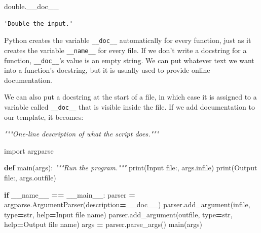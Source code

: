\documentclass[
]{krantz}
\makeatletter
\newenvironment{Shaded}{\begin{snugshade}}{\end{snugshade}}
\newcommand{\BuiltInTok}[1]{#1}
\newcommand{\CommentTok}[1]{\textcolor[rgb]{0.56,0.35,0.01}{\textit{#1}}}
\newcommand{\ControlFlowTok}[1]{\textcolor[rgb]{0.13,0.29,0.53}{\textbf{#1}}}
\newcommand{\ImportTok}[1]{#1}
\newcommand{\KeywordTok}[1]{\textcolor[rgb]{0.13,0.29,0.53}{\textbf{#1}}}
\newcommand{\NormalTok}[1]{#1}
\newcommand{\OperatorTok}[1]{\textcolor[rgb]{0.81,0.36,0.00}{\textbf{#1}}}
\newcommand{\StringTok}[1]{\textcolor[rgb]{0.31,0.60,0.02}{#1}}
\newcommand{\VariableTok}[1]{\textcolor[rgb]{0.00,0.00,0.00}{#1}}
\newenvironment{kframe}{%
\medskip{}
\setlength{\fboxsep}{.8em}
 \def\at@end@of@kframe{}%
 \ifinner\ifhmode%
  \def\at@end@of@kframe{\end{minipage}}%
  \begin{minipage}{\columnwidth}%
 \fi\fi%
 \def\FrameCommand##1{\hskip\@totalleftmargin \hskip-\fboxsep
 \colorbox{shadecolor}{##1}\hskip-\fboxsep
     \hskip-\linewidth \hskip-\@totalleftmargin \hskip\columnwidth}%
 \MakeFramed {\advance\hsize-\width
   \@totalleftmargin\z@ \linewidth\hsize
   \@setminipage}}%
 {\par\unskip\endMakeFramed%
 \at@end@of@kframe}
\renewenvironment{Shaded}{\begin{kframe}}{\end{kframe}}
\makeatother
\begin{document}
\begin{Shaded}
\begin{Highlighting}[]
\NormalTok{double.\_\_doc\_\_}
\end{Highlighting}
\end{Shaded}

\begin{verbatim}
'Double the input.'
\end{verbatim}

Python creates the variable \texttt{\_\_doc\_\_} automatically for every function,
just as it creates the variable \texttt{\_\_name\_\_} for every file.
If we don't write a docstring for a function,
\texttt{\_\_doc\_\_}'s value is an empty string.
We can put whatever text we want into a function's docstring,
but it is usually used to provide online documentation.

We can also put a docstring at the start of a file,
in which case it is assigned to a variable called \texttt{\_\_doc\_\_}
that is visible inside the file.
If we add documentation to our template,
it becomes:

\begin{Shaded}
\begin{Highlighting}[]
\CommentTok{"""One{-}line description of what the script does."""}

\ImportTok{import}\NormalTok{ argparse}


\KeywordTok{def}\NormalTok{ main(args):}
    \CommentTok{"""Run the program."""}
    \BuiltInTok{print}\NormalTok{(}\StringTok{\textquotesingle{}Input file:\textquotesingle{}}\NormalTok{, args.infile)}
    \BuiltInTok{print}\NormalTok{(}\StringTok{\textquotesingle{}Output file:\textquotesingle{}}\NormalTok{, args.outfile)}


\ControlFlowTok{if} \VariableTok{\_\_name\_\_} \OperatorTok{==} \StringTok{\textquotesingle{}\_\_main\_\_\textquotesingle{}}\NormalTok{:}
\NormalTok{    parser }\OperatorTok{=}\NormalTok{ argparse.ArgumentParser(description}\OperatorTok{=}\NormalTok{\_\_doc\_\_)}
\NormalTok{    parser.add\_argument(}\StringTok{\textquotesingle{}infile\textquotesingle{}}\NormalTok{, }\BuiltInTok{type}\OperatorTok{=}\BuiltInTok{str}\NormalTok{, }\BuiltInTok{help}\OperatorTok{=}\StringTok{\textquotesingle{}Input file name\textquotesingle{}}\NormalTok{)}
\NormalTok{    parser.add\_argument(}\StringTok{\textquotesingle{}outfile\textquotesingle{}}\NormalTok{, }\BuiltInTok{type}\OperatorTok{=}\BuiltInTok{str}\NormalTok{, }\BuiltInTok{help}\OperatorTok{=}\StringTok{\textquotesingle{}Output file name\textquotesingle{}}\NormalTok{)}
\NormalTok{    args }\OperatorTok{=}\NormalTok{ parser.parse\_args()}
\NormalTok{    main(args)}
\end{Highlighting}
\end{Shaded}
\end{document}
